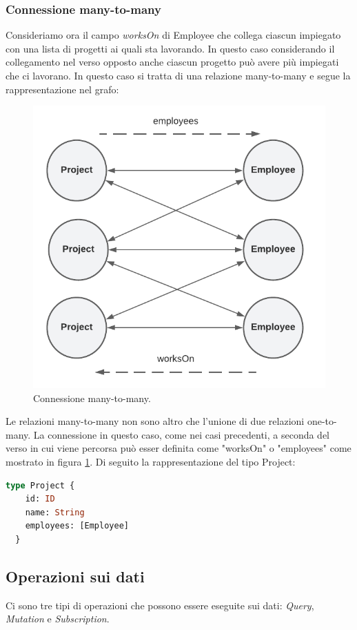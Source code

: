 \subsubsection*{Connessione many-to-many}
Consideriamo ora il campo \textit{worksOn} di Employee che collega ciascun impiegato con una lista di progetti ai quali sta lavorando. In questo caso considerando il collegamento nel verso opposto anche ciascun progetto può avere più impiegati che ci lavorano. In questo caso si tratta di una relazione many-to-many e segue la rappresentazione nel grafo:
\begin{figure}[!h]
\centering
\includegraphics[width=0.4\linewidth]{immagini/many_to_many.pdf}
\caption{Connessione many-to-many.}
\label{many-to-many}
\end{figure}
Le relazioni many-to-many non sono altro che l'unione di due relazioni one-to-many.
La connessione in questo caso, come nei casi precedenti, a seconda del verso in cui viene percorsa può esser definita come "worksOn" o "employees" come mostrato in figura \ref{many-to-many}. Di seguito la rappresentazione del tipo Project:
\begin{lstlisting}[language=GraphQL,]
  type Project {
    id: ID
    name: String
    employees: [Employee]
  }
\end{lstlisting}
\subsection*{Operazioni sui dati}
Ci sono tre tipi di operazioni che possono essere eseguite sui dati: \textit{Query}, \textit{Mutation} e \textit{Subscription}.
